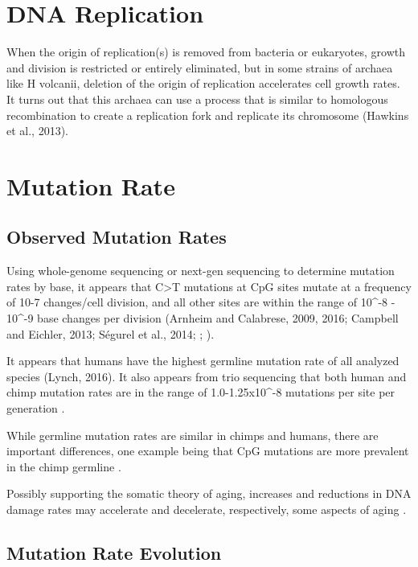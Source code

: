 \documentclass[]{book}
\begin{document}
\section{DNA Replication}\label{dna-replication}

When the origin of replication(s) is removed from bacteria or
eukaryotes, growth and division is restricted or entirely eliminated,
but in some strains of archaea like H volcanii, deletion of the origin
of replication accelerates cell growth rates. It turns out that this
archaea can use a process that is similar to homologous recombination to
create a replication fork and replicate its chromosome (Hawkins et al.,
2013).

\section{Mutation Rate}\label{mutation-rate}

\subsection{Observed Mutation Rates}\label{observed-mutation-rates}

Using whole-genome sequencing or next-gen sequencing to determine
mutation rates by base, it appears that C\textgreater{}T mutations at
CpG sites mutate at a frequency of 10-7 changes/cell division, and all
other sites are within the range of 10\^{}-8 - 10\^{}-9 base changes per
division (Arnheim and Calabrese, 2009, 2016; Campbell and Eichler, 2013;
Ségurel et al., 2014; \citet{kong2012rate};
\citet{segurel2014determinants}).

It appears that humans have the highest germline mutation rate of all
analyzed species (Lynch, 2016). It also appears from trio sequencing
that both human and chimp mutation rates are in the range of
1.0-1.25x10\^{}-8 mutations per site per generation
\citep{kong2012rate}.

While germline mutation rates are similar in chimps and humans, there
are important differences, one example being that CpG mutations are more
prevalent in the chimp germline \citep{venn2014strong}.

Possibly supporting the somatic theory of aging, increases and
reductions in DNA damage rates may accelerate and decelerate,
respectively, some aspects of aging
\citep{behjati2014genome, altieri2008dna}.

\subsection{Mutation Rate Evolution}\label{mutation-rate-evolution}
\end{document}
